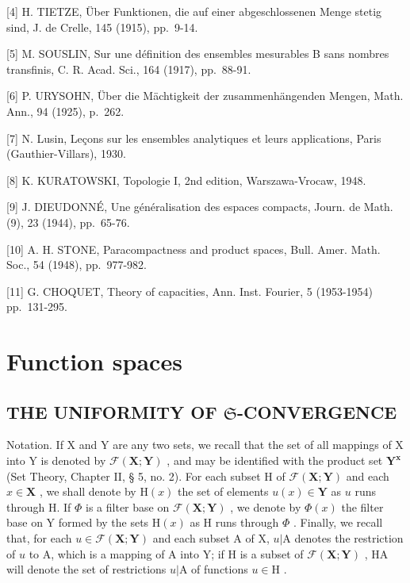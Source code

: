 {[}4{]} H. TIETZE, Über Funktionen, die auf einer abgeschlossenen Menge stetig sind, J. de Crelle, 145 (1915), pp.~9-14.

{[}5{]} M. SOUSLIN, Sur une définition des ensembles mesurables B sans nombres transfinis, C. R. Acad. Sci., 164 (1917), pp.~88-91.

{[}6{]} P. URYSOHN, Über die Mächtigkeit der zusammenhängenden Mengen, Math. Ann., 94 (1925), p.~262.

{[}7{]} N. Lusin, Leçons sur les ensembles analytiques et leurs applications, Paris (Gauthier-Villars), 1930.

{[}8{]} K. KURATOWSKI, Topologie I, 2nd edition, Warszawa-Vrocaw, 1948.

{[}9{]} J. DIEUDONNÉ, Une généralisation des espaces compacts, Journ. de Math. (9), 23 (1944), pp.~65-76.

{[}10{]} A. H. STONE, Paracompactness and product spaces, Bull. Amer. Math. Soc., 54 (1948), pp.~977-982.

{[}11{]} G. CHOQUET, Theory of capacities, Ann. Inst. Fourier, 5 (1953-1954) pp.~131-295.

\ResumeMainChapters
\chapter{Function spaces}

\section{\texorpdfstring{THE UNIFORMITY OF \(\mathfrak{S}\)-CONVERGENCE}{THE UNIFORMITY OF S-CONVERGENCE}}

Notation. If X and Y are any two sets, we recall that the set of all mappings of X into Y is denoted by \(\mathcal{F}(\mathbf{X};\mathbf{Y})\) , and may be identified with the product set \(\mathbf{Y}^{\mathbf{x}}\) (Set Theory, Chapter II, § 5, no. 2). For each subset H of \(\mathcal{F}(\mathbf{X};\mathbf{Y})\) and each \(x\in \mathbf{X}\) , we shall denote by \(\mathrm{H}(x)\) the set of elements \(u(x)\in \mathbf{Y}\) as \(u\) runs through H. If \(\Phi\) is a filter base on \(\mathcal{F}(\mathbf{X};\mathbf{Y})\) , we denote by \(\Phi (x)\) the filter base on Y formed by the sets \(\mathrm{H}(x)\) as H runs through \(\Phi\) . Finally, we recall that, for each \(u\in \mathcal{F}(\mathbf{X};\mathbf{Y})\) and each subset A of X, \(u|\mathrm{A}\) denotes the restriction of \(u\) to A, which is a mapping of A into Y; if H is a subset of \(\mathcal{F}(\mathbf{X};\mathbf{Y})\) , H\textbar A will denote the set of restrictions \(u|\mathrm{A}\) of functions \(u\in \mathrm{H}\) .

